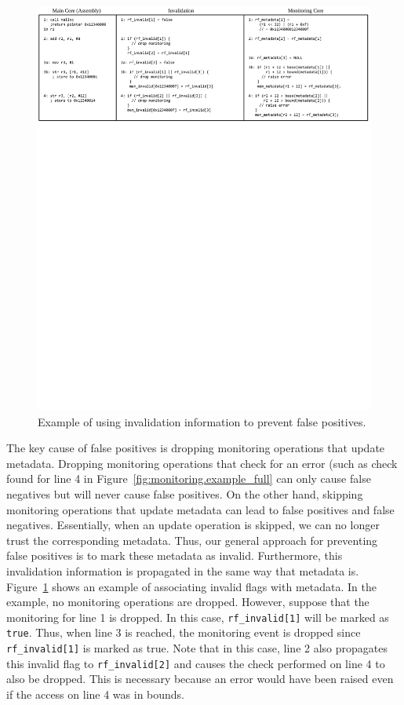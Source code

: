 \begin{figure}
  \begin{center}
    \includegraphics[]{figs/example_invalid.pdf}
    \caption{Example of using invalidation information to prevent false positives.}
    \label{fig:dropping.example_invalid}
    \vspace{-0.1in}
  \end{center}
\end{figure}

The key cause of false positives is dropping monitoring operations that update
metadata. Dropping monitoring operations that check for an error (such as check
found for line 4 in Figure~\ref{fig:monitoring.example_full} can only cause
false negatives but will never cause false positives. On the other hand,
skipping monitoring operations that update metadata can lead to false positives
and false negatives.
Essentially, when an update operation is skipped, we can no longer trust the
corresponding metadata. Thus, our general approach for preventing false positives is to mark these metadata as
invalid. Furthermore, this invalidation information is propagated in the same
way that metadata is. Figure~\ref{fig:dropping.example_invalid}
shows an example of associating invalid flags with metadata. In the example, no
monitoring operations are dropped. However, suppose that the monitoring for
line 1 is dropped. In this case, {\tt rf\_invalid[1]} will be marked as {\tt
true}. Thus, when line 3 is reached, the monitoring event is dropped
since {\tt rf\_invalid[1]} is marked as true. Note that in this case, line 2
also propagates this invalid flag to {\tt rf\_invalid[2]} and causes the check
performed on line 4 to also be dropped. This is necessary because an error
would have been raised even if the access on line 4 was in bounds.

